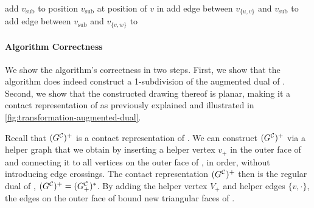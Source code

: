 \begin{algorithm}[H]
{    \label{line:transformation-loop3-start}
    add  $v_\text{sub}$ to \initmap{}\; \label{line:transformation-subdivisionvertex3}
    position $v_\text{sub}$ at position of $v$ in \clustergraph{}\;
    add edge between $v_{\{u,v\}}$ and $v_\text{sub}$ to \initmap{}\; \label{line:transformation-edgetype3-start}
    add edge between $v_\text{sub}$ and $v_{\{v,w\}}$ to \initmap{}\; \label{line:transformation-edgetype3-end}
    \label{line:transformation-loop3-end}
  }
  \Return \initmap{}
\end{algorithm}
\vfill



\paragraph{Algorithm Correctness}

We show the algorithm's correctness in two steps.
First, we show that the algorithm does indeed construct a 1-subdivision of the augmented dual of \clustergraph{}.
Second, we show that the constructed drawing thereof is planar, making it a contact representation of \clustergraph{} as previously explained and illustrated in \cref{fig:transformation-augmented-dual}.

Recall that $(G^\mathcal{C}_{})^+$ is a contact representation of \clustergraph{}.
We can construct $(G^\mathcal{C}_{})^+$ via a helper graph \clustergraph{+} that we obtain by inserting a helper vertex $v_+$ in the outer face of \clustergraph{} and connecting it to all vertices on the outer face of \clustergraph{}, in order, without introducing edge crossings.
The contact representation $(G^\mathcal{C}_{})^+$ then is the regular dual of \clustergraph{+}, \ie{} $(G^\mathcal{C}_{})^+ = (G^\mathcal{C}_{+})^*$.
By adding the helper vertex $V_+$ and helper edges $\{v,\cdot\}$, the edges on the outer face of \clustergraph{} bound new triangular faces of \clustergraph{+}.

